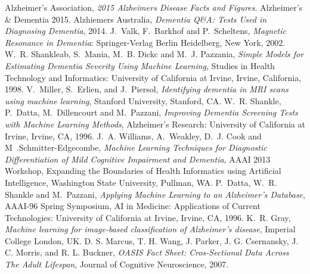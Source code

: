 \documentclass[journal,twoside]{IEEEtran}
\begin{document}

%
%
%
\begin{thebibliography}{1}
\bibitem{}
Alzheimer's Association, \emph{2015 Alzheimer\textquotesingle s Disease Facts and Figures}. Alzheimer's \& Dementia 2015.
\bibitem{}
Alzhiemer\textquotesingle s Australia, \emph{Dementia Q\&A: Tests Used in Diagnosing Dementia}, 2014.     
\bibitem{}
J.~Valk, F.~Barkhof and P.~Scheltens, \emph{Magnetic Resonance in Dementia}: Springer-Verlag Berlin Heidelberg, New York, 2002.
\bibitem{}
W.~R. Shankleab, S.~Mania, M.~B. Dickc and M.~J. Pazzania, \emph{Simple Models for Estimating Dementia Severity Using Machine Learning}, Studies in Health Technology and Informatics: University of California at Irvine, Irvine, California, 1998.
\bibitem{}
V.~Miller, S.~Erlien, and J.~Piersol, \emph{Identifying dementia in MRI scans using machine learning}, Stanford University, Stanford, CA.
\bibitem{}
W.~R. Shankle, P.~Datta, M.~Dillencourt and M.~Pazzani, \emph{Improving Dementia Screening Tests with Machine Learning Methods}, Alzheimer’s Research: University of California at Irvine, Irvine, CA, 1996.
\bibitem{}
J.~A. Williams, A.~Weakley, D.~J. Cook and M~.Schmitter-Edgecombe, \emph{Machine Learning Techniques for Diagnostic Differentiation of Mild Cognitive Impairment and Dementia}, AAAI  2013  Workshop, Expanding  the Boundaries of Health Informatics using Artificial Intelligence, Washington State University, Pullman, WA.
\bibitem{}
P.~Datta, W.~R. Shankle and M.~Pazzani, \emph{Applying Machine Learning to an Alzheimer's Database}, AAAI-96 Spring Symposium, AI in Medicine: Applications of Current Technologies: University of California at Irvine, Irvine, CA, 1996.
\bibitem{}
K.~R. Gray, \emph{Machine learning for image-based classification of Alzheimer’s disease}, Imperial College London, UK.
\bibitem{}
D. S. Marcus, T. H. Wang, J. Parker, J. G. Csernansky, J. C. Morris, and R. L. Buckner, \emph{OASIS Fact Sheet: Cros-Sectional Data Across The Adult Lifespan}, Journal of Cognitive Neuroscience, 2007.

\end{thebibliography}
\end{document}
